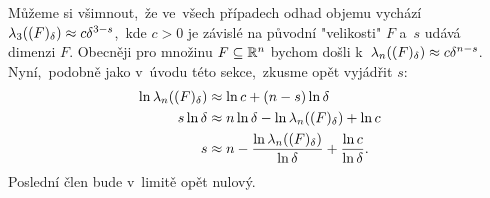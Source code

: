 Můžeme si všimnout,~že ve~všech případech odhad objemu vychází $\lambda_3((F)_\delta)\approx c\delta^{3-s}$,~kde $c>0$ je závislé na původní "velikosti" $F$ a~$s$ udává dimenzi $F$. Obecněji pro množinu $F\subseteq\mathbb{R}^n$ bychom došli k~$\lambda_n((F)_\delta)\approx c\delta^{n-s}$. Nyní,~podobně jako v~úvodu této sekce,~zkusme opět vyjádřit $s$:
\begin{align*}
    \ln{\ensuremath{\lambda_n}((F)_\delta)}&\approx\ln{c}+(n-s)\ln{\delta}\\
    s\ln{\delta}&\approx n\ln{\delta}-\ln{\ensuremath{\lambda_n}((F)_\delta)}+\ln{c}\\
    s&\approx n-\dfrac{\ln{\ensuremath{\lambda_n}((F)_\delta)}}{\ln{\delta}}+\dfrac{\ln{c}}{\ln{\delta}}.
\end{align*}
Poslední člen bude v~limitě opět nulový.

